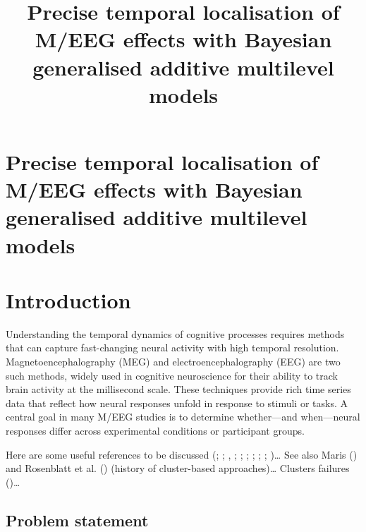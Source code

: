 \documentclass[
  doc,
  floatsintext,
  longtable,
  a4paper,
  nolmodern,
  notxfonts,
  notimes,
  colorlinks=true,linkcolor=blue,citecolor=blue,urlcolor=blue]{apa7}
\title{Precise temporal localisation of M/EEG effects with Bayesian
generalised additive multilevel models}
\begin{document}
\maketitle

\hypertarget{toc}{}
\tableofcontents
\newpage
\section[Introduction]{Precise temporal localisation of M/EEG effects
with Bayesian generalised additive multilevel models}

\setcounter{secnumdepth}{-\maxdimen} %

\setlength\LTleft{0pt}

\resetlinenumber[1]

\section{Introduction}\label{introduction}

Understanding the temporal dynamics of cognitive processes requires
methods that can capture fast-changing neural activity with high
temporal resolution. Magnetoencephalography (MEG) and
electroencephalography (EEG) are two such methods, widely used in
cognitive neuroscience for their ability to track brain activity at the
millisecond scale. These techniques provide rich time series data that
reflect how neural responses unfold in response to stimuli or tasks. A
central goal in many M/EEG studies is to determine whether---and
when---neural responses differ across experimental conditions or
participant groups.

Here are some useful references to be discussed
(;
;
,
; ; ;
;
;
;
)\ldots{} See also Maris
() and Rosenblatt et al.
() (history of cluster-based
approaches)\ldots{} Clusters failures ()\ldots{}

\subsection{Problem statement}\label{problem-statement}
\end{document}
